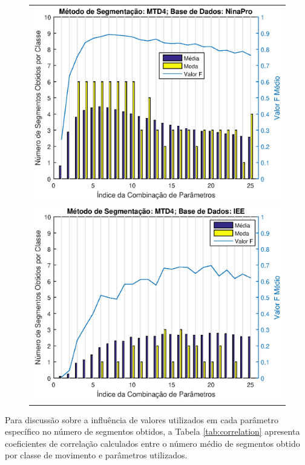 \begin{figure}[!htb]
{
	\begin{tabular}{c}
	\includegraphics[width=0.95\linewidth]{./img/matlab/results/mtd4_nina.eps} \\
	\includegraphics[width=0.95\linewidth]{./img/matlab/results/mtd4_iee.eps} \\
	\end{tabular}
}{}
\end{figure}

Para discussão sobre a influência de valores utilizados em cada parâmetro específico no número de segmentos obtidos, a Tabela \ref{tab:correlation} apresenta coeficientes de correlação calculados entre o número médio de segmentos obtido por classe de movimento e parâmetros utilizados.

